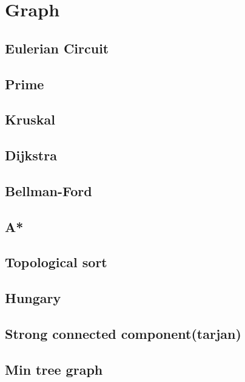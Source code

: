 \newpage
\section{Graph}

\subsection{Eulerian Circuit}


\subsection{Prime}


\subsection{Kruskal}



\subsection{Dijkstra}


\subsection{Bellman-Ford}


\subsection{A*}
\subsection{Topological sort}


\subsection{Hungary}


\subsection{Strong connected component(tarjan)}


\subsection{Min tree graph}
